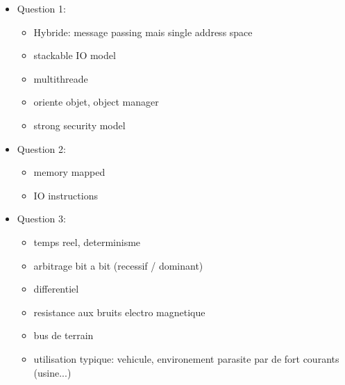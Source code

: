 \begin{correction}
\begin{itemize}
  \item Question 1:
    \begin{itemize}
    \item Hybride: message passing mais single address space
    \item stackable IO model
    \item multithreade
    \item oriente objet, object manager
    \item strong security model
    \end{itemize}
  \item Question 2:
    \begin{itemize}
    \item memory mapped
    \item IO instructions
    \end{itemize}
  \item Question 3:
    \begin{itemize}
    \item temps reel, determinisme
    \item arbitrage bit a bit (recessif / dominant)
    \item differentiel
    \item resistance aux bruits electro magnetique
    \item bus de terrain
    \item utilisation typique: vehicule, environement parasite par de fort courants (usine...)
    \end{itemize}
\end{itemize}
\end{correction}


